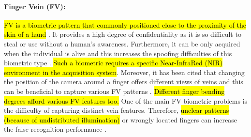 \documentclass[review]{elsarticle}
\begin{document}
	\paragraph{\textbf{Finger Vein (FV):}} \hl{FV is a biometric pattern that commonly positioned close to the proximity of the skin of a hand} \cite{hartung2012vascular}. It provides a high degree of confidentiality as it is so difficult to steal or use without a human's awareness. Furthermore, it can be only acquired when the individual is alive and this increases the spoofing difficulties of this biometric type \cite{Kumar2012Human}. \hl{Such a biometric requires a specific Near-InfraRed (NIR) environment in the acquisition system}. Moreover, it has been cited that changing the position of the camera around a finger offers different views of veins and this can be beneficial to capture various FV patterns \cite{Lu2014Finger}. \hl{Different finger bending degrees afford various FV features too.}
	One of the main FV biometric problems is the difficulty of capturing distinct vein features. Therefore, \hl{unclear patterns (because of undistributed illumination)} or wrongly located fingers can increase the false recognition performance \cite{Lee2009Restoration}. 
\end{document}

